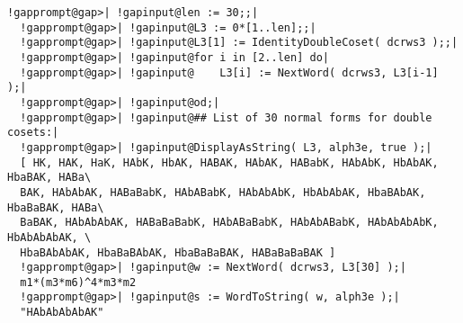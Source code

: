 \documentclass[a4paper,11pt]{report}
\begin{document}
{{\begin{Verbatim}[commandchars=!@|,fontsize=\small,frame=single,label=Example]
  !gapprompt@gap>| !gapinput@len := 30;;|
  !gapprompt@gap>| !gapinput@L3 := 0*[1..len];;|
  !gapprompt@gap>| !gapinput@L3[1] := IdentityDoubleCoset( dcrws3 );;|
  !gapprompt@gap>| !gapinput@for i in [2..len] do|
  !gapprompt@gap>| !gapinput@    L3[i] := NextWord( dcrws3, L3[i-1] );|
  !gapprompt@gap>| !gapinput@od;|
  !gapprompt@gap>| !gapinput@## List of 30 normal forms for double cosets:|
  !gapprompt@gap>| !gapinput@DisplayAsString( L3, alph3e, true );|
  [ HK, HAK, HaK, HAbK, HbAK, HABAK, HAbAK, HABabK, HAbAbK, HbAbAK, HbaBAK, HABa\
  BAK, HAbAbAK, HABaBabK, HAbABabK, HAbAbAbK, HbAbAbAK, HbaBAbAK, HbaBaBAK, HABa\
  BaBAK, HAbAbAbAK, HABaBaBabK, HAbABaBabK, HAbAbABabK, HAbAbAbAbK, HbAbAbAbAK, \
  HbaBAbAbAK, HbaBaBAbAK, HbaBaBaBAK, HABaBaBaBAK ]
  !gapprompt@gap>| !gapinput@w := NextWord( dcrws3, L3[30] );|
  m1*(m3*m6)^4*m3*m2
  !gapprompt@gap>| !gapinput@s := WordToString( w, alph3e );|
  "HAbAbAbAbAK"
  
\end{Verbatim}
 }

 }

         
\end{document}
